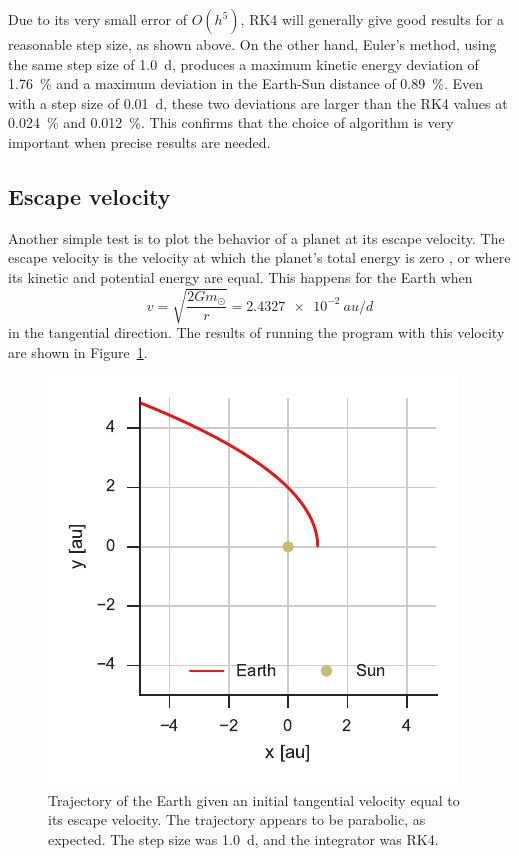\documentclass[aps,prc,reprint]{revtex4-1}
\newcommand{\sun}[0]{\ensuremath{\odot}}
\begin{document}
        Due to its very small error of $O(h^5)$, RK4 will generally give good results for a reasonable step size, as shown above. On the other hand, Euler's method, using the same step size of \SI{1.0}{d}, produces a maximum kinetic energy deviation of \SI{1.76}{\percent} and a maximum deviation in the Earth-Sun distance of \SI{0.89}{\percent}. Even with a step size of \SI{0.01}{d}, these two deviations are larger than the RK4 values at \SI{0.024}{\percent} and \SI{0.012}{\percent}. This confirms that the choice of algorithm is very important when precise results are needed.

    \subsection{Escape velocity}
    \label{sub:escape}

        Another simple test is to plot the behavior of a planet at its escape velocity. The escape velocity is the velocity at which the planet's total energy is zero \cite{Goldstein2002}, or where its kinetic and potential energy are equal. This happens for the Earth when
        \begin{equation}
            v = \sqrt{\frac{2Gm_\sun}{r}} = \SI{2.4327e-2}{au/d}
        \end{equation}
        in the tangential direction. The results of running the program with this velocity are shown in Figure~\ref{fig:escape}.

        \begin{figure}
            \includegraphics{escape.pdf}
            \caption{Trajectory of the Earth given an initial tangential velocity equal to its escape velocity. The trajectory appears to be parabolic, as expected. \cite{Goldstein2002} The step size was \SI{1.0}{d}, and the integrator was RK4.}
            \label{fig:escape}
        \end{figure}
\end{document}
